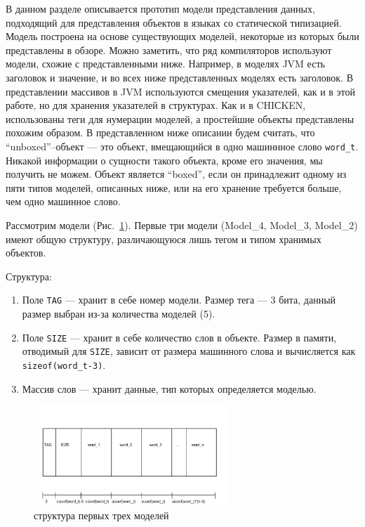 В данном разделе описывается прототип модели представления данных, подходящий для представления объектов в языках со статической типизацией.
Модель построена на основе существующих моделей, некоторые из которых были представлены в обзоре. Можно заметить, что ряд компиляторов используют модели, схожие с 
представленными ниже. Например, в моделях JVM есть заголовок и значение, и во всех ниже представленных моделях есть заголовок. В представлении массивов в JVM 
используются смещения указателей, как и в этой работе, но для хранения указателей в структурах.  Как и в CHIСKEN, использованы теги для нумерации моделей,
а простейшие объекты представлены похожим образом. В представленном ниже описании будем считать, что ``unboxed''--объект --- это объект,
вмещающийся в одно машиннное слово \lstinline{word_t}.  Никакой информации о сущности такого объекта, кроме его значения, мы получить не можем.
Объект является ``boxed'', если он принадлежит одному из пяти типов моделей, описанных ниже, или на его хранение требуется больше,
чем одно машинное слово.

Рассмотрим модели (Рис.~\ref{first}). Первые три модели (Model\_4, Model\_3, Model\_2) имеют общую структуру, различающуюся лишь тегом и типом хранимых объектов.

Структура:
\begin{enumerate}
\item Поле \lstinline{TAG} --- хранит в себе номер модели. Размер тега --- 3 бита, данный размер выбран из-за количества моделей (5).
\item Поле \lstinline{SIZE} --- хранит в себе количество слов в объекте. Размер в памяти, отводимый для \lstinline{SIZE}, зависит от размера машинного слова и вычисляется как \lstinline{sizeof(word_t-3)}.
\item Массив слов --- хранит данные, тип которых определяется моделью.
\end{enumerate}

\begin{figure}[h]
\includegraphics[width=0.65\textwidth]{Kren/1}
\caption{структура первых трех моделей}
\label{first}
\end{figure}

